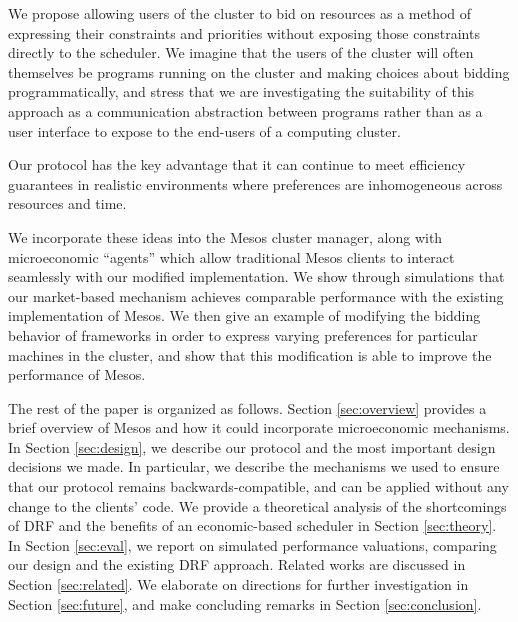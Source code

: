 \documentclass{acm_proc_article-sp}
\begin{document}
We propose allowing users of the cluster to bid on resources
as a method of expressing their constraints and priorities without exposing
those constraints directly to the scheduler. We imagine that the users
of the cluster will often themselves be programs running on the cluster
and making choices about bidding programmatically, and stress that we are
investigating the suitability of this approach as a communication abstraction
between programs rather than as a user interface to expose to the end-users
of a computing cluster.

Our protocol has the key advantage that it can continue to meet
efficiency guarantees in realistic environments where preferences are
inhomogeneous across resources and time.

We incorporate these ideas into the Mesos cluster manager, along with microeconomic
``agents'' which allow traditional Mesos clients to interact seamlessly with our
modified implementation. We show through simulations that our market-based mechanism 
achieves comparable performance with the existing implementation of Mesos.
We then give an example of modifying the bidding behavior of frameworks
in order to express varying preferences for particular machines in the cluster,
and show that this modification is able to improve the performance of Mesos.

The rest of the paper is organized as follows.
Section \ref{sec:overview} provides a brief overview of Mesos and how it
could incorporate microeconomic mechanisms.
%
%
In Section \ref{sec:design}, we describe our protocol and the most important design decisions
we made. In particular, we describe the mechanisms we used to ensure that our
protocol remains backwards-compatible, and can be applied without any change to
the clients' code.
%
We provide a theoretical analysis of the shortcomings of DRF and the benefits of an economic-based scheduler in Section \ref{sec:theory}.
%
In Section \ref{sec:eval}, we report on simulated performance valuations, comparing our
design and the existing DRF approach.
Related works are discussed in Section \ref{sec:related}.
We elaborate on directions for further investigation in Section \ref{sec:future}, and make concluding remarks in Section \ref{sec:conclusion}.
\end{document}
